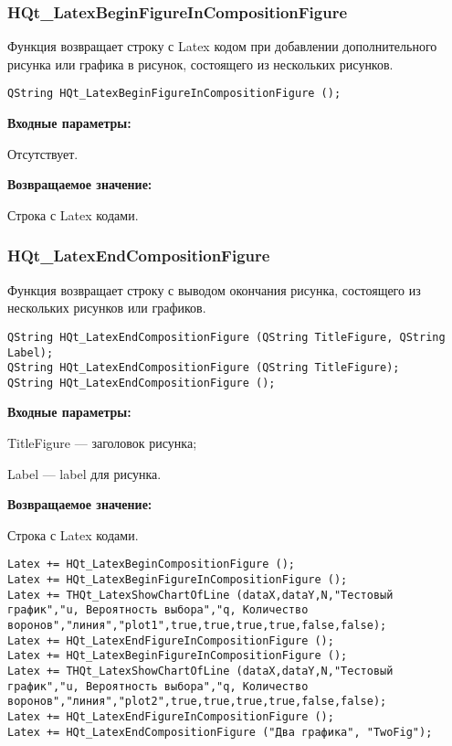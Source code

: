\documentclass[a4paper,12pt]{article}
\begin{document}
\subsubsection{HQt\_LatexBeginFigureInCompositionFigure}\label{HQt_LatexBeginFigureInCompositionFigure}

Функция возвращает строку с Latex кодом при добавлении дополнительного рисунка или графика в рисунок, состоящего из нескольких рисунков.


\begin{lstlisting}[label=code_syntax_HQt_LatexBeginFigureInCompositionFigure,caption=Синтаксис]
QString HQt_LatexBeginFigureInCompositionFigure ();
\end{lstlisting}

\textbf{Входные параметры:}

Отсутствует.

\textbf{Возвращаемое значение:}

Строка с Latex кодами.


\subsubsection{HQt\_LatexEndCompositionFigure}\label{HQt_LatexEndCompositionFigure}

Функция возвращает строку с выводом окончания рисунка, состоящего из нескольких рисунков или графиков.


\begin{lstlisting}[label=code_syntax_HQt_LatexEndCompositionFigure,caption=Синтаксис]
QString HQt_LatexEndCompositionFigure (QString TitleFigure, QString Label);
QString HQt_LatexEndCompositionFigure (QString TitleFigure);
QString HQt_LatexEndCompositionFigure ();
\end{lstlisting}

\textbf{Входные параметры:}

TitleFigure --- заголовок рисунка;

     Label --- label для рисунка.

\textbf{Возвращаемое значение:}

Строка с Latex кодами.


\begin{lstlisting}[label=code_use_HQt_LatexEndCompositionFigure,caption=Пример использования]
Latex += HQt_LatexBeginCompositionFigure ();
Latex += HQt_LatexBeginFigureInCompositionFigure ();
Latex += THQt_LatexShowChartOfLine (dataX,dataY,N,"Тестовый график","u, Вероятность выбора","q, Количество воронов","линия","plot1",true,true,true,true,false,false);
Latex += HQt_LatexEndFigureInCompositionFigure ();
Latex += HQt_LatexBeginFigureInCompositionFigure ();
Latex += THQt_LatexShowChartOfLine (dataX,dataY,N,"Тестовый график","u, Вероятность выбора","q, Количество воронов","линия","plot2",true,true,true,true,false,false);
Latex += HQt_LatexEndFigureInCompositionFigure ();
Latex += HQt_LatexEndCompositionFigure ("Два графика", "TwoFig");
\end{lstlisting}
\end{document}
